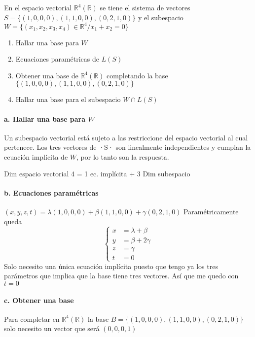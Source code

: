 \begin{problema}{\cite[6p338]{palacios}}{
	En el espacio vectorial $\mathbb{R}^4(\mathbb{R})$ se tiene el sistema de vectores
	${S=\{(1,0,0,0),(1,1,0,0),(0,2,1,0)\}}$ y el subespacio
	${W=\{(x_1,x_2,x_3,x_4)\in\mathbb{R}^4/x_1+x_2=0\}}$
	\begin{enumerate}
		\item Hallar una base para $W$
		\item Ecuaciones paramétricas de $L(S)$
		\item Obtener una base de $\mathbb{R}^4(\mathbb{R})$ completando la base
			${\{(1,0,0,0),(1,1,0,0),(0,2,1,0)\}}$
		\item Hallar una base para el subespacio $W\cap L(S)$
	\end{enumerate}
	}
	\paragraph{a. Hallar una base para $W$} Un subespacio vectorial está sujeto a las restriccione
	del espacio vectorial al cual pertenece. Los tres vectores de ·S· son linealmente independientes 
	y cumplan la ecuación implícita de $W$, por lo tanto son la respuesta.
	\begin{center}
		Dim espacio vectorial 4 = 1 ec. implícita + 3 Dim subespacio
	\end{center}

	\paragraph{b. Ecuaciones paramétricas} $(x,y,z,t)=\lambda(1,0,0,0)+\beta(1,1,0,0)+\gamma(0,2,1,0)$
	Paramétricamente queda
	$$\begin{cases}
		x &= \lambda+\beta \\
		y &= \beta+2\gamma \\
		z &= \gamma \\
		t &= 0
	\end{cases}$$
	Solo necesito una única ecuación implícita puesto que tengo ya los tres parámetros que implica que la
	base tiene tres vectores. Así que me quedo con $t=0$

	\paragraph{c. Obtener una base} Para completar en $\mathbb{R}^4(\mathbb{R})$ la base
	${B=\{(1,0,0,0),(1,1,0,0),(0,2,1,0)\}}$ solo necesito un vector que será
	$(0,0,0,1)$


\end{problema}
